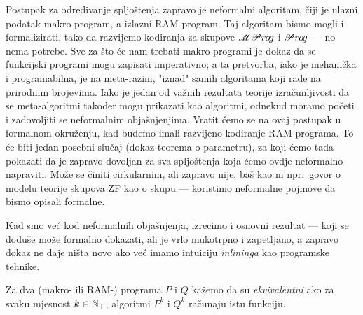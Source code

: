 Postupak za određivanje spljoštenja zapravo je neformalni algoritam, čiji je ulazni podatak makro-program, a izlazni RAM-program. Taj algoritam bismo mogli i formalizirati, tako da razvijemo kodiranja za skupove $\mathscr{MP}r\mspace{-1mu}o\mspace{-2mu}g$ i $\mathscr Pr\mspace{-1mu}o\mspace{-2mu}g$ --- no nema potrebe. Sve za što će nam trebati makro-programi je dokaz da se funkcijski programi mogu zapisati imperativno; a ta pretvorba, iako je mehanička i programabilna, je na meta-razini, "iznad" samih algoritama koji rade na prirodnim brojevima. Iako je jedan od važnih rezultata teorije izračunljivosti da se meta-algoritmi također mogu prikazati kao algoritmi, odnekud moramo početi i zadovoljiti se neformalnim objašnjenjima. Vratit ćemo se na ovaj postupak u formalnom okruženju, kad budemo imali razvijeno kodiranje RAM-programa. To će biti jedan posebni slučaj (dokaz teorema o parametru), za koji ćemo tada pokazati da je zapravo dovoljan za sva spljoštenja koja ćemo ovdje neformalno napraviti. Može se činiti cirkularnim, ali zapravo nije; baš kao ni npr.\ govor o modelu teorije skupova ZF kao o skupu --- koristimo neformalne pojmove da bismo opisali formalne.


Kad smo već kod neformalnih objašnjenja, izrecimo i osnovni rezultat --- koji se doduše može formalno dokazati, ali je vrlo mukotrpno i zapetljano, a zapravo dokaz ne daje ništa novo ako već imamo intuiciju \emph{inlininga} kao programske tehnike.

\begin{definicija}[{name=[ekvivalentnost programa]}]\label{def:ekvprog}
Za dva (makro- ili RAM-\!) programa $P$ i $Q$ kažemo da su \emph{ekvivalentni} ako za svaku mjesnost $k\in{\mathbb N}_+$, algoritmi $P^k$ i $Q^k$ računaju istu funkciju.
\end{definicija}

